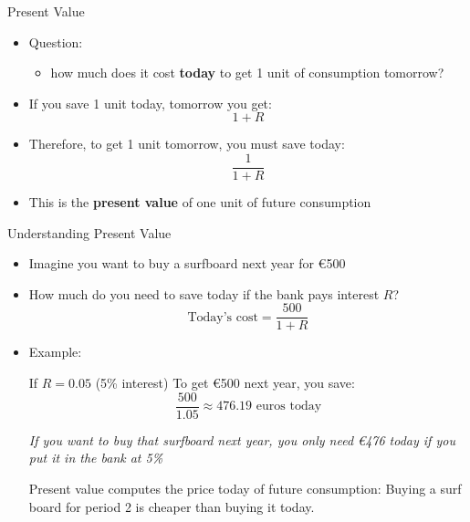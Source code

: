 \documentclass[10pt,aspectratio=169]{beamer}
\begin{document}
\begin{frame}{Present Value}

\begin{itemize}
    \item Question:
    \begin{itemize}
        \item how much does it cost \textbf{today} to get 1 unit of consumption tomorrow?
    \end{itemize}
    \vspace{0.3cm}

    \item If you save 1 unit today, tomorrow you get:
    \[
    1+R
    \]
    \vspace{0.3cm}

    \item Therefore, to get 1 unit tomorrow, you must save today:
    \[
    \frac{1}{1+R}
    \]
    \vspace{0.3cm}

    \item This is the \textbf{present value} of one unit of future consumption
\end{itemize}

\end{frame}
\begin{frame}{Understanding Present Value}

\begin{itemize}
    \item Imagine you want to buy a surfboard next year for €500
    \vspace{0.2cm}
    
    \item How much do you need to save today if the bank pays interest \(R\)?
    \[
    \text{Today’s cost} = \frac{500}{1+R}
    \]  
    \item Example:
    \begin{itemize}
        \itemvso If \(R = 0.05\) (5\% interest)
        \itemvso To get €500 next year, you save:
        \[
        \frac{500}{1.05} \approx 476.19 \text{ euros today}
        \]
    \end{itemize}
    \textit{If you want to buy that surfboard next year, you only need €476 today if you put it in the bank at 5\%}
    
    \itemvso Present value computes the price today of future consumption: Buying a surf board for period 2 is cheaper than buying it today.
\end{itemize}

\end{frame}
\end{document}
